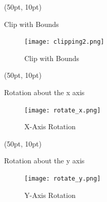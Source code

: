 \documentclass[aspectratio=169,12pt]{beamer}
\begin{document}
\begin{frame}[fragile]
\begin{textblock*}{350pt}(50pt, 10pt)
\begin{block}{Clip with Bounds}

\begin{figure}
\texttt{[image: clipping2.png]}
\caption{Clip with Bounds\label{ClipWithBounds}}
\end{figure}
\end{block}
\end{textblock*}
\end{frame}

\begin{frame}[fragile]
\begin{textblock*}{350pt}(50pt, 10pt)
\begin{block}{Rotation about the x axis}
\end{block}

\begin{figure}
\texttt{[image: rotate\_x.png]}
\caption{X-Axis Rotation}
\end{figure}
\end{textblock*}
\end{frame}

\begin{frame}[fragile]
\begin{textblock*}{350pt}(50pt, 10pt)
\begin{block}{Rotation about the y axis}
\end{block}

\begin{figure}
\texttt{[image: rotate\_y.png]}
\caption{Y-Axis Rotation}
\end{figure}
\end{textblock*}
\end{frame}
\end{document}
